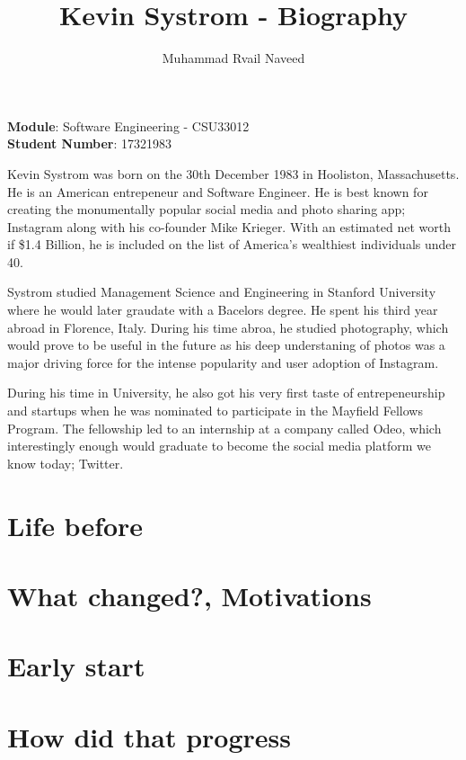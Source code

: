 \documentclass[12pt]{article}
\title{\textbf{Kevin  Systrom -  Biography}}
\author{Muhammad Rvail Naveed}
\date{}
\begin{document}
    \maketitle

    \begin{center}
        \textbf{Module}: Software Engineering - CSU33012 \\
        \textbf{Student Number}: 17321983 
    \end{center}

    \newpage

    Kevin Systrom was born on the 30th December 1983 in Hooliston, Massachusetts. He is 
    an American entrepeneur and Software Engineer. He is best known for creating the monumentally
    popular social media and photo sharing app; Instagram along with his co-founder Mike Krieger. With an estimated net
    worth if \$1.4 Billion, he is included on the list of America's wealthiest individuals under 40.

    Systrom studied Management Science and Engineering in Stanford University 
    where he would later graudate with a Bacelors degree. He spent his third year abroad in Florence, Italy.
    During his time abroa, he studied photography, which would prove to be useful in the future as his deep understaning of photos
    was a major driving force for the intense popularity and user adoption of Instagram.

    During his time in University, he also got his very first taste of entrepeneurship 
    and startups when he was nominated to participate in the Mayfield Fellows Program. 
    The fellowship led to an internship at a company called Odeo, which interestingly enough
    would graduate to become the social media platform we know today; Twitter.

    \section{Life before}
    \section{What changed?, Motivations}
    \section{Early start}
    \section{How did that progress}
\end{document}
